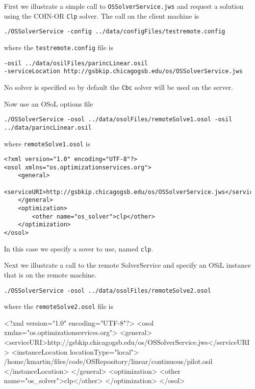 \documentclass[11pt]{article}
\renewcommand{\_}{{\char"5F}}
\renewcommand{\{}{{\char"7B}}
\renewcommand{\}}{{\char"7D}}
\renewcommand{\^}{{\char"0D}}
\renewcommand{\'}{{\char"0D}}
\begin{document}
First we illustrate a simple call to   {\tt OSSolverService.jws} and request a solution using the COIN-OR  {\tt Clp} solver.  The call on the client machine is

\begin{verbatim}
./OSSolverService -config ../data/configFiles/testremote.config
\end{verbatim}
where the {\tt testremote.config} file is
\begin{verbatim}
-osil ../data/osilFiles/parincLinear.osil
-serviceLocation http://gsbkip.chicagogsb.edu/os/OSSolverService.jws
\end{verbatim}

No solver is specified so by default the  {\tt Cbc} solver will be used on the server.

Now use an OSoL options file
\begin{verbatim}
./OSSolverService -osol ../data/osolFiles/remoteSolve1.osol -osil ../data/parincLinear.osil
\end{verbatim}
where {\tt remoteSolve1.osol} is
\begin{verbatim}
<?xml version="1.0" encoding="UTF-8"?>
<osol xmlns="os.optimizationservices.org">
    <general>
        <serviceURI>http://gsbkip.chicagogsb.edu/os/OSSolverService.jws</serviceURI>
    </general>
    <optimization>
    	<other name="os_solver">clp</other>
    </optimization>
</osol>
\end{verbatim}
In this case we specify a sover to use, named {\tt clp}.

Next we illustrate a call to the remote SolverService and specify an OSiL instance that is on the remote machine.
\begin{verbatim}
./OSSolverService -osol ../data/osolFiles/remoteSolve2.osol
\end{verbatim}
where the {\tt remoteSolve2.osol} file is
\begin{verbatimtab}[4]
<?xml version="1.0" encoding="UTF-8"?>
<osol xmlns="os.optimizationservices.org">
    <general>
        <serviceURI>http://gsbkip.chicagogsb.edu/os/OSSolverService.jws</serviceURI>
         <instanceLocation locationType="local">
	 /home/kmartin/files/code/OSRepository/linear/continuous/pilot.osil
	 </instanceLocation>
    </general>
    <optimization>
    	<other name="os_solver">clp</other>
    </optimization>
</osol>
\end{verbatimtab}
\end{document}
